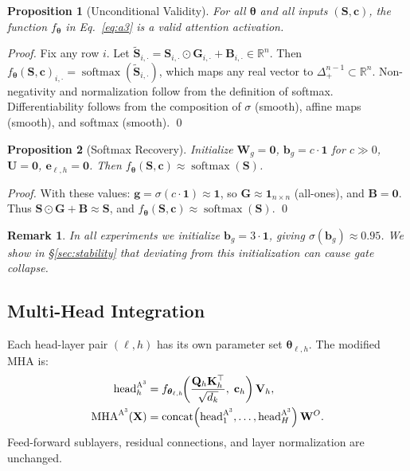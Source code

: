\documentclass[11pt]{article}
\newtheorem{proposition}{Proposition}
\newtheorem{remark}{Remark}
\newcommand{\softmax}{\operatorname{softmax}}
\newcommand{\AAA}{\textsc{A\textsuperscript{3}}}
\newcommand{\RR}{\mathbb{R}}
\newcommand{\btheta}{\boldsymbol{\theta}}
\newcommand{\bQ}{\mathbf{Q}}
\newcommand{\bK}{\mathbf{K}}
\newcommand{\bV}{\mathbf{V}}
\newcommand{\bW}{\mathbf{W}}
\newcommand{\bX}{\mathbf{X}}
\newcommand{\bS}{\mathbf{S}}
\newcommand{\bG}{\mathbf{G}}
\newcommand{\bB}{\mathbf{B}}
\newcommand{\bU}{\mathbf{U}}
\newcommand{\bc}{\mathbf{c}}
\newcommand{\be}{\mathbf{e}}
\newcommand{\bg}{\mathbf{g}}
\newcommand{\bb}{\mathbf{b}}
\begin{document}
\begin{proposition}[Unconditional Validity]
\label{prop:valid}
For all $\btheta$ and all inputs $(\bS, \bc)$, the function $f_{\btheta}$ in Eq.~\eqref{eq:a3} is a valid attention activation.
\end{proposition}
\begin{proof}
Fix any row $i$. Let $\tilde{\bS}_{i,\cdot} = \bS_{i,\cdot} \odot \bG_{i,\cdot} + \bB_{i,\cdot} \in \RR^n$. Then $f_{\btheta}(\bS,\bc)_{i,\cdot} = \softmax(\tilde{\bS}_{i,\cdot})$, which maps any real vector to $\Delta^{n-1}_{+} \subset \RR^n$. Non-negativity and normalization follow from the definition of softmax. Differentiability follows from the composition of $\sigma$ (smooth), affine maps (smooth), and softmax (smooth). \qed
\end{proof}

\begin{proposition}[Softmax Recovery]
\label{prop:recovery}
Initialize $\bW_g = \mathbf{0}$, $\bb_g = c\cdot\mathbf{1}$ for $c \gg 0$, $\bU = \mathbf{0}$, $\be_{\ell,h} = \mathbf{0}$. Then $f_{\btheta}(\bS,\bc) \approx \softmax(\bS)$.
\end{proposition}
\begin{proof}
With these values: $\bg = \sigma(c\cdot\mathbf{1}) \approx \mathbf{1}$, so $\bG \approx \mathbf{1}_{n\times n}$ (all-ones), and $\bB = \mathbf{0}$. Thus $\bS \odot \bG + \bB \approx \bS$, and $f_{\btheta}(\bS,\bc) \approx \softmax(\bS)$. \qed
\end{proof}

\begin{remark}
In all experiments we initialize $\bb_g = 3\cdot\mathbf{1}$, giving $\sigma(\bb_g) \approx 0.95$. We show in \S\ref{sec:stability} that deviating from this initialization can cause gate collapse.
\end{remark}

\subsection{Multi-Head Integration}

Each head-layer pair $(\ell, h)$ has its own parameter set $\btheta_{\ell,h}$. The modified MHA is:
\begin{align}
  \operatorname{head}_h^{\AAA{}}
    &= f_{\btheta_{\ell,h}}\!\!\left(\frac{\bQ_h\bK_h^\top}{\sqrt{d_k}},\;\bc_h\right)\bV_h,\\
  \operatorname{MHA}^{\AAA{}}(\bX)
    &= \operatorname{concat}\!\left(\operatorname{head}_1^{\AAA{}},\ldots,
       \operatorname{head}_H^{\AAA{}}\right)\bW^O.
\end{align}
Feed-forward sublayers, residual connections, and layer normalization are unchanged.
\end{document}
